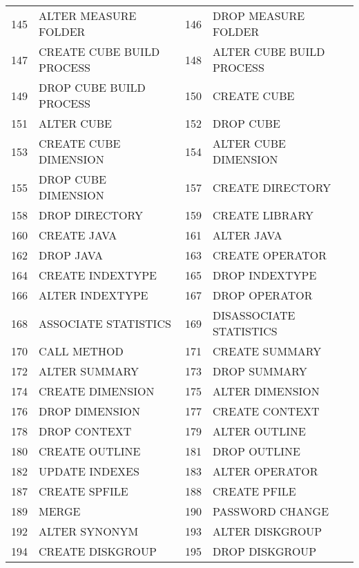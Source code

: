 \begin{appendix}
\begin{longtable}[]{@{}rl|rl@{}}
145 & ALTER MEASURE FOLDER         & 146 & DROP MEASURE FOLDER          \\
147 & CREATE CUBE BUILD PROCESS    & 148 & ALTER CUBE BUILD PROCESS     \\
149 & DROP CUBE BUILD PROCESS      & 150 & CREATE CUBE                  \\
151 & ALTER CUBE                   & 152 & DROP CUBE                    \\
153 & CREATE CUBE DIMENSION        & 154 & ALTER CUBE DIMENSION         \\
155 & DROP CUBE DIMENSION          & 157 & CREATE DIRECTORY             \\
158 & DROP DIRECTORY               & 159 & CREATE LIBRARY               \\
160 & CREATE JAVA                  & 161 & ALTER JAVA                   \\
162 & DROP JAVA                    & 163 & CREATE OPERATOR              \\
164 & CREATE INDEXTYPE             & 165 & DROP INDEXTYPE               \\
166 & ALTER INDEXTYPE              & 167 & DROP OPERATOR                \\
168 & ASSOCIATE STATISTICS         & 169 & DISASSOCIATE STATISTICS      \\
170 & CALL METHOD                  & 171 & CREATE SUMMARY               \\
172 & ALTER SUMMARY                & 173 & DROP SUMMARY                 \\
174 & CREATE DIMENSION             & 175 & ALTER DIMENSION              \\
176 & DROP DIMENSION               & 177 & CREATE CONTEXT               \\
178 & DROP CONTEXT                 & 179 & ALTER OUTLINE                \\
180 & CREATE OUTLINE               & 181 & DROP OUTLINE                 \\
182 & UPDATE INDEXES               & 183 & ALTER OPERATOR               \\
187 & CREATE SPFILE                & 188 & CREATE PFILE                 \\
189 & MERGE                        & 190 & PASSWORD CHANGE              \\
192 & ALTER SYNONYM                & 193 & ALTER DISKGROUP              \\
194 & CREATE DISKGROUP             & 195 & DROP DISKGROUP               \\

\end{longtable}
\end{appendix}
